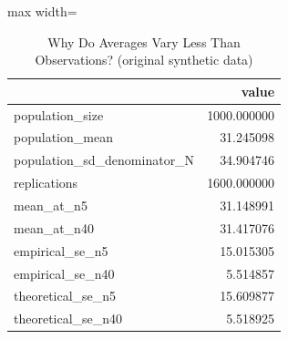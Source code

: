 \begin{table}[htbp]
\centering
\caption{Why Do Averages Vary Less Than Observations? (original synthetic data)}
\begingroup
\small
\setlength{\tabcolsep}{6pt}
\renewcommand{\arraystretch}{1.12}
\begin{adjustbox}{max width=\linewidth}
\begin{tabular}{@{}lr@{}}
\toprule
 & value \\
\midrule
population\_size & 1000.000000 \\
population\_mean & 31.245098 \\
population\_sd\_denominator\_N & 34.904746 \\
replications & 1600.000000 \\
mean\_at\_n5 & 31.148991 \\
mean\_at\_n40 & 31.417076 \\
empirical\_se\_n5 & 15.015305 \\
empirical\_se\_n40 & 5.514857 \\
theoretical\_se\_n5 & 15.609877 \\
theoretical\_se\_n40 & 5.518925 \\
\bottomrule
\end{tabular}
\end{adjustbox}
\endgroup
\end{table}